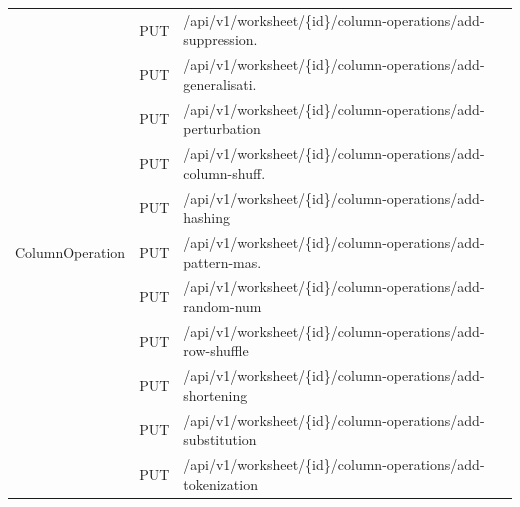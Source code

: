 \documentclass[a4paper,twoside,12pt]{book}
\begin{document}
\begin{table}[]
\begin{tabular}{|c|l|l|}
\multicolumn{1}{|c|}{\multirow{11}{*}{\footnotesize ColumnOperation}} & \multicolumn{1}{l|}{\footnotesize PUT}                      & \footnotesize /api/v1/worksheet/\{id\}/column-operations/add-suppression.  \\
\multicolumn{1}{|c|}{}                                             & \multicolumn{1}{l|}{\footnotesize PUT}            & \footnotesize /api/v1/worksheet/\{id\}/column-operations/add-generalisati.     \\
\multicolumn{1}{|c|}{}                                             & \multicolumn{1}{l|}{\footnotesize PUT}            & \footnotesize /api/v1/worksheet/\{id\}/column-operations/add-perturbation  \\
\multicolumn{1}{|c|}{}                                             & \multicolumn{1}{l|}{\footnotesize PUT}            & \footnotesize /api/v1/worksheet/\{id\}/column-operations/add-column-shuff.    \\
\multicolumn{1}{|c|}{}                                             & \multicolumn{1}{l|}{\footnotesize PUT}            & \footnotesize /api/v1/worksheet/\{id\}/column-operations/add-hashing         \\
\multicolumn{1}{|c|}{}                                             & \multicolumn{1}{l|}{\footnotesize PUT}            & \footnotesize /api/v1/worksheet/\{id\}/column-operations/add-pattern-mas. \\
\multicolumn{1}{|c|}{}                                             & \multicolumn{1}{l|}{\footnotesize PUT}            & \footnotesize /api/v1/worksheet/\{id\}/column-operations/add-random-num   \\
\multicolumn{1}{|c|}{}                                             & \multicolumn{1}{l|}{\footnotesize PUT}            & \footnotesize /api/v1/worksheet/\{id\}/column-operations/add-row-shuffle     \\
\multicolumn{1}{|c|}{}                                             & \multicolumn{1}{l|}{\footnotesize PUT}            & \footnotesize /api/v1/worksheet/\{id\}/column-operations/add-shortening      \\
\multicolumn{1}{|c|}{}                                             & \multicolumn{1}{l|}{\footnotesize PUT}            & \footnotesize /api/v1/worksheet/\{id\}/column-operations/add-substitution    \\
\multicolumn{1}{|c|}{}                                             & \multicolumn{1}{l|}{\footnotesize PUT}            & \footnotesize /api/v1/worksheet/\{id\}/column-operations/add-tokenization    \\ \hline


\end{tabular}
\end{table}
\end{document}

